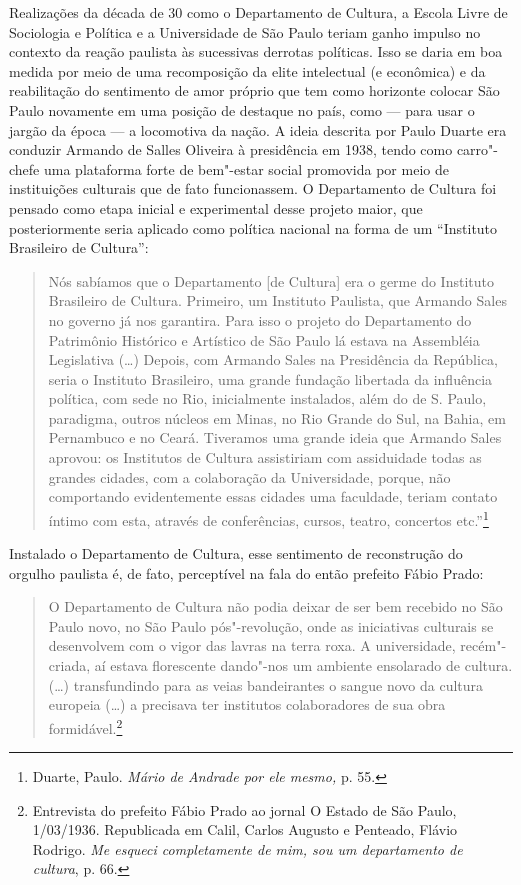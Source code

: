 Realizações da década de 30 como o Departamento de Cultura, a Escola
Livre de Sociologia e Política e a Universidade de São Paulo teriam
ganho impulso no contexto da reação paulista às sucessivas derrotas
políticas. Isso se daria em boa medida por meio de uma recomposição da
elite intelectual (e econômica) e da reabilitação do sentimento de amor
próprio que tem como horizonte colocar São Paulo novamente em uma
posição de destaque no país, como --- para usar o jargão da época --- a
locomotiva da nação. A ideia descrita por Paulo Duarte era conduzir
Armando de Salles Oliveira à presidência em 1938, tendo como carro"-chefe
uma plataforma forte de bem"-estar social promovida por meio de
instituições culturais que de fato funcionassem. O Departamento de
Cultura foi pensado como etapa inicial e experimental desse projeto
maior, que posteriormente seria aplicado como política nacional na forma
de um ``Instituto Brasileiro de Cultura'':

\begin{quote}
Nós sabíamos que o Departamento {[}de Cultura{]} era o germe do
Instituto Brasileiro de Cultura. Primeiro, um Instituto Paulista, que
Armando Sales no governo já nos garantira. Para isso o projeto do
Departamento do Patrimônio Histórico e Artístico de São Paulo lá estava
na Assembléia Legislativa (\ldots{}) Depois, com Armando Sales na Presidência
da República, seria o Instituto Brasileiro, uma grande fundação
libertada da influência política, com sede no Rio, inicialmente
instalados, além do de S. Paulo, paradigma, outros núcleos em Minas, no
Rio Grande do Sul, na Bahia, em Pernambuco e no Ceará. Tiveramos uma
grande ideia que Armando Sales aprovou: os Institutos de Cultura
assistiriam com assiduidade todas as grandes cidades, com a colaboração
da Universidade, porque, não comportando evidentemente essas cidades uma
faculdade, teriam contato íntimo com esta, através de conferências,
cursos, teatro, concertos etc.''\footnote{Duarte, Paulo. \emph{Mário de
  Andrade por ele mesmo,} p. 55.}
\end{quote}

Instalado o Departamento de Cultura, esse sentimento de reconstrução do
orgulho paulista é, de fato, perceptível na fala do então prefeito Fábio
Prado:

\begin{quote}
O Departamento de Cultura não podia deixar de ser bem recebido no São
Paulo novo, no São Paulo pós"-revolução, onde as iniciativas culturais se
desenvolvem com o vigor das lavras na terra roxa. A universidade,
recém"-criada, aí estava florescente dando"-nos um ambiente ensolarado de
cultura. (\ldots{}) transfundindo para as veias bandeirantes o sangue
novo da cultura europeia (\ldots{}) a  precisava ter institutos
colaboradores de sua obra formidável.\footnote{Entrevista do prefeito
  Fábio Prado ao jornal O Estado de São Paulo, 1/03/1936. Republicada em
  Calil, Carlos Augusto e Penteado, Flávio Rodrigo. \emph{Me esqueci
  completamente de mim, sou um departamento de cultura}, p. 66.}
\end{quote}

